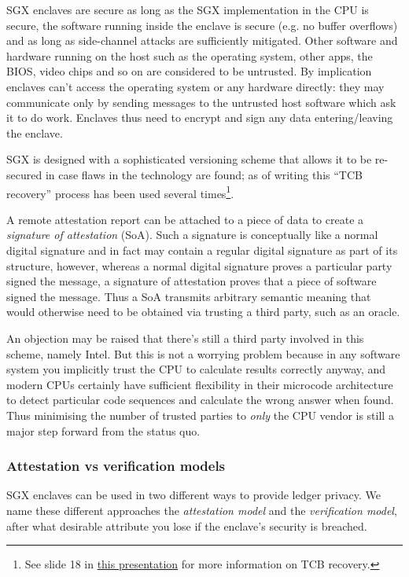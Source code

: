 \documentclass{article}
\begin{document}
SGX enclaves are secure as long as the SGX implementation in the CPU is secure, the software running inside the
enclave is secure (e.g. no buffer overflows) and as long as side-channel attacks are sufficiently mitigated. Other
software and hardware running on the host such as the operating system, other apps, the BIOS, video chips and so on
are considered to be untrusted. By implication enclaves can't access the operating system or any hardware directly:
they may communicate only by sending messages to the untrusted host software which ask it to do work. Enclaves thus
need to encrypt and sign any data entering/leaving the enclave.

SGX is designed with a sophisticated versioning scheme that allows it to be re-secured in case flaws in the
technology are found; as of writing this ``TCB recovery'' process has been used several times\footnote{See slide 18
in \href{https://www.slideshare.net/DesmondYuen/intel-software-guard-extension}{this presentation} for more
information on TCB recovery.}.

A remote attestation report can be attached to a piece of data to create a \emph{signature of attestation} (SoA).
Such a signature is conceptually like a normal digital signature and in fact may contain a regular digital signature
as part of its structure, however, whereas a normal digital signature proves a particular party signed the message,
a signature of attestation proves that a piece of software signed the message. Thus a SoA transmits arbitrary
semantic meaning that would otherwise need to be obtained via trusting a third party, such as an oracle.

An objection may be raised that there's still a third party involved in this scheme, namely Intel. But this
is not a worrying problem because in any software system you implicitly trust the CPU to calculate results
correctly anyway, and modern CPUs certainly have sufficient flexibility in their microcode architecture to detect
particular code sequences and calculate the wrong answer when found. Thus minimising the number of trusted parties
to \emph{only} the CPU vendor is still a major step forward from the status quo.

\subsubsection{Attestation vs verification models}

SGX enclaves can be used in two different ways to provide ledger privacy. We name these different approaches the
\emph{attestation model} and the \emph{verification model}, after what desirable attribute you lose if the
enclave's security is breached.
\end{document}
